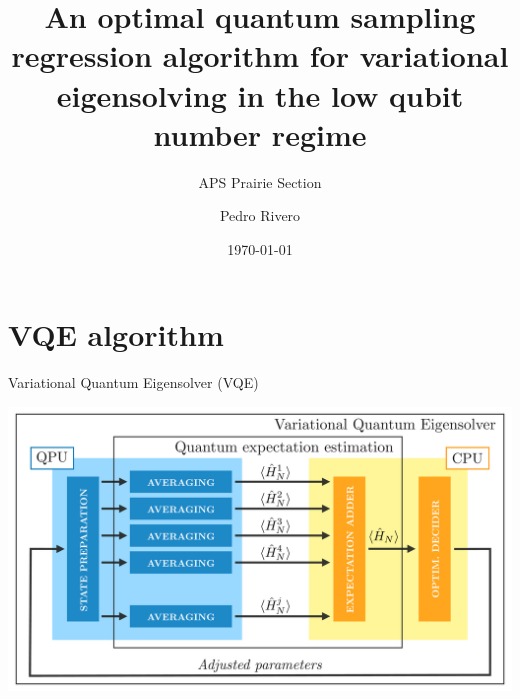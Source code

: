 \documentclass[9pt, handout, aspectratio=169]{beamer}	%
\title{An optimal quantum sampling regression algorithm for variational eigensolving in the low qubit number regime}
\subtitle{APS Prairie Section}
\author{Pedro Rivero}
\institute{Illinois Institute of Technology \\ Argonne National Laboratory}
\date{\today}
\begin{document}
	\justify
	\setlength{\abovedisplayskip}{0pt}
	\setlength{\belowdisplayskip}{12pt}
	\setlength{\abovedisplayshortskip}{0pt}
	\setlength{\belowdisplayshortskip}{12pt}

\begin{frame}[plain,t]
	\titlepage
\end{frame}




\section{VQE algorithm}

\begin{frame}{Variational Quantum Eigensolver (VQE)}

	\begin{center}
		\includegraphics[width=.7\paperwidth]{Figures/VQE}
	\end{center}

\end{frame}

\end{document}
